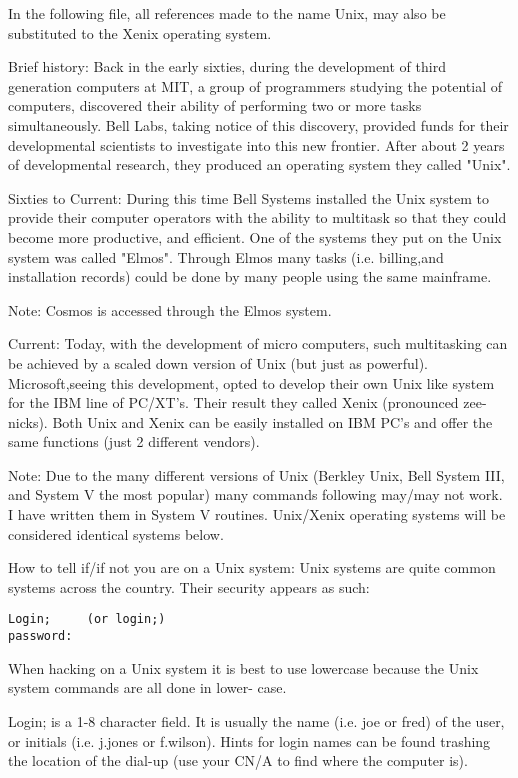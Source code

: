 \documentclass[a1paper]{article}
\begin{document}
\begin{multicols}{7}
{  In the following file, all references made to the name Unix, may also be
substituted to the Xenix operating system.

  Brief history:  Back in the early sixties, during the development of third
generation computers at MIT, a group of programmers studying the potential of
computers, discovered their ability of performing two or more tasks
simultaneously.  Bell Labs, taking notice of this discovery, provided funds for
their developmental scientists to investigate into this new frontier.  After
about 2 years of developmental research, they produced an operating system they
called "Unix".

  Sixties to Current:  During this time Bell Systems installed the Unix system
to provide their computer operators with the ability to multitask so that they
could become more productive, and efficient.  One of the systems they put on the
Unix system was called "Elmos".  Through Elmos many tasks (i.e.  billing,and
installation records) could be done by many people using the same mainframe.

  Note:  Cosmos is accessed through the Elmos system.

  Current:  Today, with the development of micro computers, such multitasking
can be achieved by a scaled down version of Unix (but just as powerful).
Microsoft,seeing this development, opted to develop their own Unix like system
for the IBM line of PC/XT's.  Their result they called Xenix (pronounced
zee-nicks).  Both Unix and Xenix can be easily installed on IBM PC's and offer
the same functions (just 2 different vendors).

  Note:  Due to the many different versions of Unix (Berkley Unix, Bell System
III, and System V the most popular) many commands following may/may not work.  I
have written them in System V routines.  Unix/Xenix operating systems will be
considered identical systems below.

  How to tell if/if not you are on a Unix system:  Unix systems are quite common
systems across the country.  Their security appears as such:

\begin{verbatim}
Login;     (or login;)
password:
\end{verbatim}

  When hacking on a Unix system it is best to use lowercase because the Unix
system commands are all done in lower- case.

  Login; is a 1-8 character field.  It is usually the name (i.e.  joe or fred)
of the user, or initials (i.e.  j.jones or f.wilson).  Hints for login names can
be found trashing the location of the dial-up (use your CN/A to find where the
computer is).

}
\end{multicols}
\end{document}
